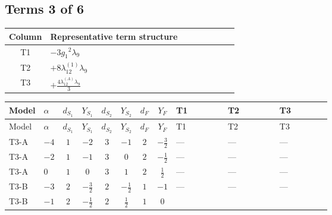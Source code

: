 \documentclass[8pt]{article}
\begin{document}
\begin{landscape}
\subsection*{Terms 3 of 6}
\begin{center}
\begin{tabular}{@{}c >{\raggedright\arraybackslash}p{0.82\linewidth}@{}}
\toprule
Column & Representative term structure \\
\midrule
T1 & \(\displaystyle -3 {g_1}^2 {\lambda_{9}}\) \\
\midrule
T2 & \(\displaystyle +8 {\lambda_{12}^{(1)}} {\lambda_{9}}\) \\
\midrule
T3 & \(\displaystyle +\frac{4 {\lambda_{12}^{(A)}} {\lambda_{9}}}{3}\) \\
\midrule
\bottomrule
\end{tabular}
\end{center}
\smallskip
\tiny
\begin{longtable}{@{}llcccccc >{\raggedright\arraybackslash}p{0.21\linewidth} >{\raggedright\arraybackslash}p{0.21\linewidth} >{\raggedright\arraybackslash}p{0.21\linewidth}@{}}
\toprule
Model & $\alpha$ & $d_{S_1}$ & $Y_{S_1}$ & $d_{S_2}$ & $Y_{S_2}$ & $d_F$ & $Y_F$ & T1 & T2 & T3 \\
\midrule
\endfirsthead
\toprule
Model & $\alpha$ & $d_{S_1}$ & $Y_{S_1}$ & $d_{S_2}$ & $Y_{S_2}$ & $d_F$ & $Y_F$ & T1 & T2 & T3 \\
\midrule
\endhead
T3-A & $-4$ & $1$ & $-2$ & $3$ & $-1$ & $2$ & $-\frac{3}{2}$ & --- & --- & --- \\
\midrule
T3-A & $-2$ & $1$ & $-1$ & $3$ & $0$ & $2$ & $-\frac{1}{2}$ & --- & --- & --- \\
\midrule
T3-A & $0$ & $1$ & $0$ & $3$ & $1$ & $2$ & $\frac{1}{2}$ & --- & --- & --- \\
\midrule
T3-B & $-3$ & $2$ & $-\frac{3}{2}$ & $2$ & $-\frac{1}{2}$ & $1$ & $-1$ & --- & --- & --- \\
\midrule
T3-B & $-1$ & $2$ & $-\frac{1}{2}$ & $2$ & $\frac{1}{2}$ & $1$ & $0$ & \scriptsize\adjustbox{max width=\linewidth}{$\begin{gathered} -3 {g_1}^2 {\lambda_{9}}\end{gathered}$} & \scriptsize\adjustbox{max width=\linewidth}{$\begin{gathered} +8 {\lambda_{12}^{(1)}} {\lambda_{9}}\end{gathered}$} & \scriptsize\adjustbox{max width=\linewidth}{$\begin{gathered} +\frac{4 {\lambda_{12}^{(A)}} {\lambda_{9}}}{3}\end{gathered}$} \\

\end{longtable}
\end{landscape}
\end{document}
